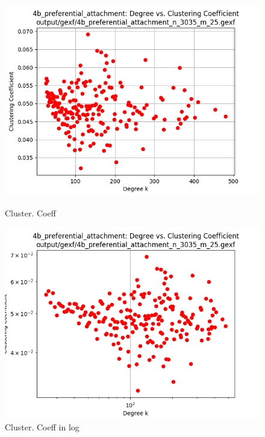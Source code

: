 \documentclass[runningheads]{llncs}
\begin{document}
\begin{figure}
    \centering
    \begin{minipage}{0.5\textwidth}
        \centering
        \includegraphics[width=\textwidth]{4b_preferential_attachment_clustering_coeff} %
        \caption{Cluster. Coeff}
        \label{fig_4b_preferential_attachment_clustering_coeff}
    \end{minipage}\hfill
    \begin{minipage}{0.5\textwidth}
        \centering
        \includegraphics[width=\textwidth]{4b_preferential_attachment_clustering_coeff_log} %
        \caption{ Cluster. Coeff in log}
        \label{fig_4b_preferential_attachment_clustering_coeff_log}
    \end{minipage}
\end{figure}
\end{document}
